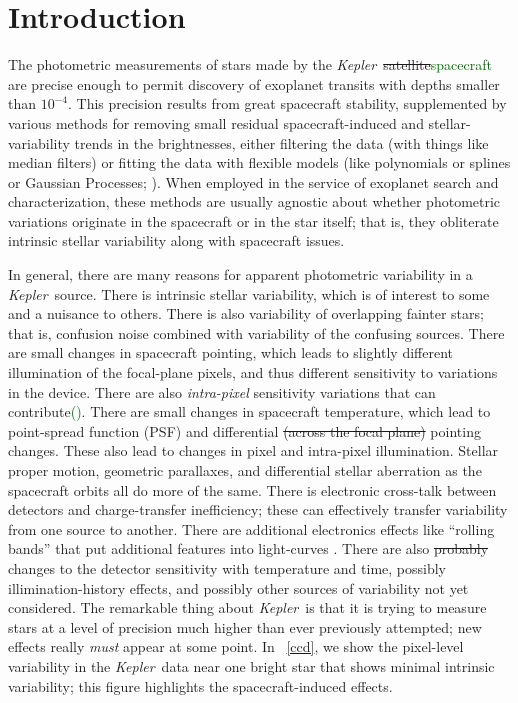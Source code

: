 \documentclass[12pt, preprint]{aastex}
\newcommand{\project}[1]{\textsl{#1}}
\newcommand{\Kepler}{\project{Kepler}}
\newcommand{\revise}[1]{\textcolor{darkgreen}{#1}}
\newcommand{\remove}[1]{\sout{#1}}
\begin{document}
\section{Introduction}

The photometric measurements of stars made by the \Kepler\ \remove{satellite}\revise{spacecraft} are precise enough
  to permit discovery of exoplanet transits with depths smaller than $10^{-4}$.
This precision results from great spacecraft stability,
  supplemented by various methods for removing small residual spacecraft-induced and stellar-variability trends in the brightnesses,
  either filtering the data (with things like median filters)
  or fitting the data with flexible models (like polynomials or splines or Gaussian Processes; 
  \citealt{gaussian}).
When employed in the service of exoplanet search and characterization,
  these methods are usually agnostic about whether photometric variations originate in the spacecraft or in the star itself;
  that is, they obliterate intrinsic stellar variability along with spacecraft issues.

In general, there are many reasons for apparent photometric variability in a \Kepler\ source.
There is intrinsic stellar variability,
  which is of interest to some and a nuisance to others.
There is also variability of overlapping fainter stars;
  that is, confusion noise combined with variability of the confusing sources.
There are small changes in spacecraft pointing,
  which leads to slightly different illumination of the focal-plane pixels,
  and thus different sensitivity to variations in the device.
There are also \emph{intra-pixel} sensitivity variations that can contribute\revise{(\citealt{subpixel})}.
There are small changes in spacecraft temperature,
  which lead to point-spread function (PSF) and differential \remove{(across the focal plane)} pointing changes.
These also lead to changes in pixel and intra-pixel illumination.
Stellar proper motion, geometric parallaxes, and differential stellar aberration as the spacecraft orbits all do more of the same.
There is electronic cross-talk between detectors and charge-transfer inefficiency;
  these can effectively transfer variability from one source to another.
There are additional electronics effects like ``rolling bands'' that put additional features into light-curves \revise{\citep{handbook}}.
There are also \remove{probably} changes to the detector sensitivity with temperature and time,
  possibly illimination-history effects,
  and possibly other sources of variability not yet considered.
The remarkable thing about \Kepler\ is that it is trying to measure stars at a level of precision
  much higher than ever previously attempted;
  new effects really \emph{must} appear at some point.
In \figurename~\ref{ccd}, we show the pixel-level variability in the \Kepler\ data
  near one bright star that shows minimal intrinsic variability;
  this figure highlights the spacecraft-induced effects.
\end{document}
